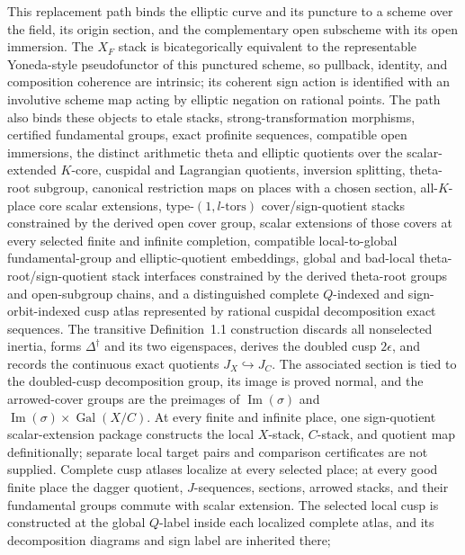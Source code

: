 \begin{definition}
  \leanok
  This replacement path binds the elliptic curve and its puncture to a scheme
  over the field, its origin section, and the complementary open subscheme with
  its open immersion.  The \(X_F\) stack is bicategorically equivalent to the
  representable Yoneda-style pseudofunctor of this punctured scheme, so
  pullback, identity, and composition coherence are intrinsic; its coherent sign action
  is identified with an involutive scheme map acting by elliptic negation on
  rational points.  The path also binds these objects to etale stacks, strong-transformation
  morphisms, certified fundamental groups, exact profinite sequences,
  compatible open immersions, the distinct arithmetic theta and elliptic
  quotients over the scalar-extended \(K\)-core, cuspidal and Lagrangian
  quotients, inversion splitting, theta-root subgroup, canonical restriction
  maps on places with a chosen section, all-\(K\)-place core scalar extensions,
  type-\((1,l\text{-tors})\)
  cover/sign-quotient stacks constrained by the derived open cover group,
  scalar extensions of those covers at every selected finite and infinite
  completion, compatible local-to-global fundamental-group and elliptic-quotient
  embeddings,
  global and bad-local theta-root/sign-quotient stack interfaces constrained
  by the derived theta-root groups and open-subgroup chains, and a distinguished
  complete \(Q\)-indexed and sign-orbit-indexed cusp atlas represented by
  rational cuspidal decomposition exact sequences.  The transitive
  Definition~1.1 construction discards all nonselected inertia, forms
  \(\Delta^\dagger\) and its two eigenspaces, derives the doubled cusp
  \(2\epsilon\), and records the continuous exact quotients
  \(J_X\hookrightarrow J_C\).  The associated section is tied to the
  doubled-cusp decomposition group, its image is proved normal, and the
  arrowed-cover groups are the preimages of
  \(\operatorname{Im}(\sigma)\) and
  \(\operatorname{Im}(\sigma)\times\operatorname{Gal}(X/C)\).
  At every finite and infinite place, one sign-quotient scalar-extension
  package constructs the local \(X\)-stack, \(C\)-stack, and quotient map
  definitionally; separate local target pairs and comparison certificates are
  not supplied.  Complete cusp atlases localize at every selected place; at every good finite
  place the dagger quotient, \(J\)-sequences, sections, arrowed stacks, and
  their fundamental groups commute with scalar extension.  The selected local
  cusp is constructed at the global \(Q\)-label inside each localized complete
  atlas, and its decomposition diagrams and sign label are inherited there;

\end{definition}
